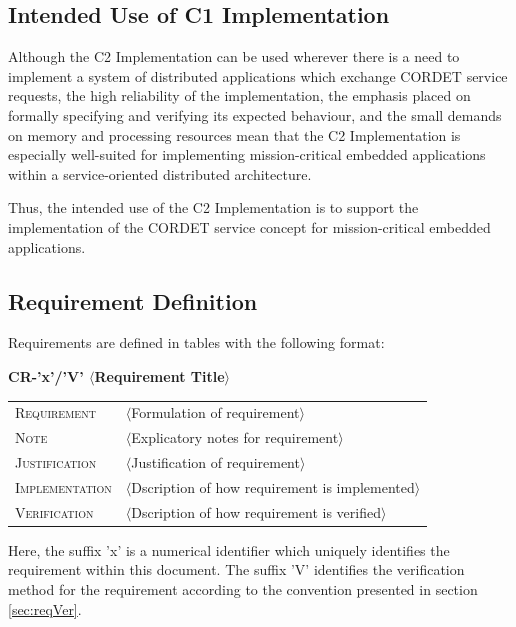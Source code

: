 \documentclass[a4paper,10pt]{article}
\begin{document}
\subsection{Intended Use of C1 Implementation}\label{sec:intendedUse}
Although the C2 Implementation can be used wherever there is a need to implement a system of distributed applications which exchange CORDET service requests, the high reliability of the implementation, the emphasis placed on formally specifying and verifying its expected behaviour, and the small demands on memory and processing resources mean that the C2 Implementation is especially well-suited for implementing mission-critical embedded applications within a service-oriented distributed architecture. 

Thus, the intended use of the C2 Implementation is to support the implementation of the CORDET service concept for mission-critical embedded applications.

\subsection{Requirement Definition}\label{sec:reqDef}
Requirements are defined in tables with the following format:

\hspace{0.2cm}\textbf{CR-'x'/'V' \hspace{0.9cm} $\langle$Requirement Title$\rangle$}
\vspace{-10pt}

\begin{longtable}{p{2.7cm}P{8.5cm}}
\hline
\textsc{Requirement} & $\langle$Formulation of requirement$\rangle$ \\
\textsc{Note} & $\langle$Explicatory notes for requirement$\rangle$ \\
\textsc{Justification} & $\langle$Justification of requirement$\rangle$ \\
\textsc{Implementation} & $\langle$Dscription of how requirement is implemented$\rangle$ \\ 
\textsc{Verification} & $\langle$Dscription of how requirement is verified$\rangle$ \\
\hline
\end{longtable}

Here, the suffix 'x' is a numerical identifier which uniquely identifies the requirement
within this document. The suffix 'V' identifies the verification method for the requirement according to the convention presented in section \ref{sec:reqVer}.
\end{document}
